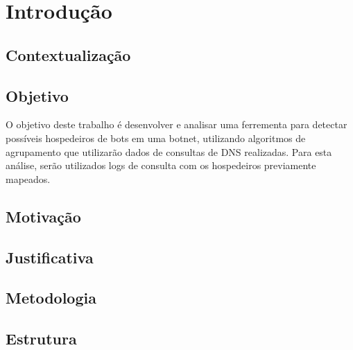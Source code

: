 \chapter{Introdução}
\section{Contextualização}
\section{Objetivo}
O objetivo deste trabalho é desenvolver e analisar uma ferrementa para detectar possíveis hospedeiros de bots em uma botnet, utilizando algoritmos de agrupamento que utilizarão dados de consultas de DNS realizadas. Para esta análise, serão utilizados logs de consulta com os hospedeiros previamente mapeados.

\section{Motivação}
\section{Justificativa}
\section{Metodologia}
\section{Estrutura}